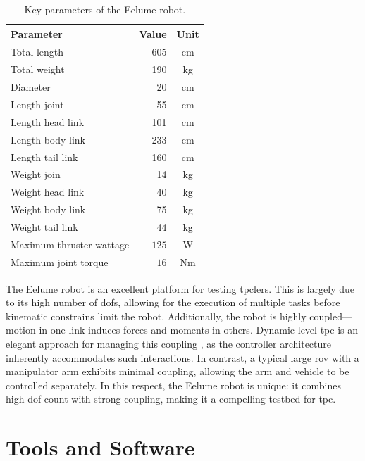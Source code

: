 \begin{table}[h]
    \centering
    \begin{tabular}{|l|r|c|}
        \hline
        Parameter  & Value & Unit   \\ \hline \hline
        Total length & 605 &  cm    \\ \hline
        Total weight & 190  & kg    \\ \hline
        Diameter & 20 & cm    \\ \hline
        Length joint     & 55 & cm    \\ \hline
        Length head link & 101 & cm     \\ \hline
        Length body link & 233 & cm     \\ \hline
        Length tail link & 160 & cm     \\ \hline
        Weight join      & 14 & kg     \\ \hline
        Weight head link & 40 & kg     \\ \hline
        Weight body link & 75 & kg     \\ \hline
        Weight tail link & 44 & kg     \\ \hline
        Maximum thruster wattage & \(125\) & W     \\ \hline
        Maximum joint torque & \(16\) & Nm     \\ \hline
        \hline
    \end{tabular}
    \caption{Key parameters of the Eelume robot.}
    \label{tab:eelume:keynumbers}
\end{table}

The Eelume robot is an excellent platform for testing \gls{tpc}lers.
This is largely due to its high number of \gls{dof}s, allowing for the 
execution of multiple tasks before kinematic constrains limit the robot. Additionally, 
the robot is highly coupled—motion in one link induces forces and moments in 
others. Dynamic-level \gls{tpc} is an elegant approach for managing this coupling
, as the controller architecture inherently accommodates such interactions. In 
contrast, a typical large \gls{rov} with a manipulator arm exhibits minimal 
coupling, allowing the arm and vehicle to be controlled separately. In this 
respect, the Eelume robot is unique: it combines high \gls{dof} count with 
strong coupling, making it a compelling testbed for \gls{tpc}.

\section{Tools and Software}

